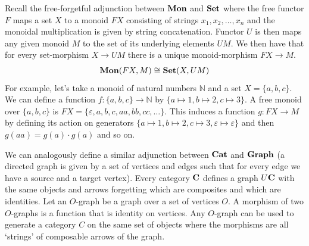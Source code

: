 \documentclass[acmsmall,screen, nonacm, anonymous]{acmart}
\begin{document}
Recall the free-forgetful adjunction between $\mathbf{Mon}$ and $\mathbf{Set}$ where the free functor $F$ maps a set $X$ to a monoid $FX$ consisting of strings $x_1,x_2,\ldots,x_n$ and the monoidal multiplication is given by string concatenation.
Functor $U$ is then maps any given monoid $M$ to the set of its underlying elements $UM$.
We then have that for every set-morphism $X \to UM$ there is a unique monoid-morphism $FX \to M$.
\[
\mathbf{Mon}(FX, M) \cong \mathbf{Set}(X, UM)
\]
For example, let's take a monoid of natural numbers $\mathbb{N}$ and a set $X = \{a,b,c\}$.
We can define a function $f : \{a,b,c\} \to \mathbb{N}$ by $\{a \mapsto 1, b \mapsto 2, c \mapsto 3 \}$.
A free monoid over $\{a,b,c\}$ is $FX = \{\varepsilon,a,b,c,aa,bb,cc,\ldots\}$.
This induces a function $g : FX \to M$ by defining its action on generators $\{a \mapsto 1, b \mapsto 2, c \mapsto 3, \varepsilon \mapsto \varepsilon\}$ and then $g(aa) = g(a)\cdot g(a)$ and so on.

We can analogously define a similar adjunction between $\mathbf{Cat}$ and $\mathbf{Graph}$ (a directed graph is given by a set of vertices and edges such that for every edge we have a source and a target vertex).
Every category $\mathbf{C}$ defines a graph $U\mathbf{C}$ with the same objects and arrows forgetting which are composites and which are identities.
Let an $O$-graph be a graph over a set of vertices $O$.
A morphism of two $O$-graphs is a function that is identity on vertices.
Any $O$-graph can be used to generate a category $C$ on the same set of objects where the morphisms are all `strings' of composable arrows of the graph.
\end{document}
